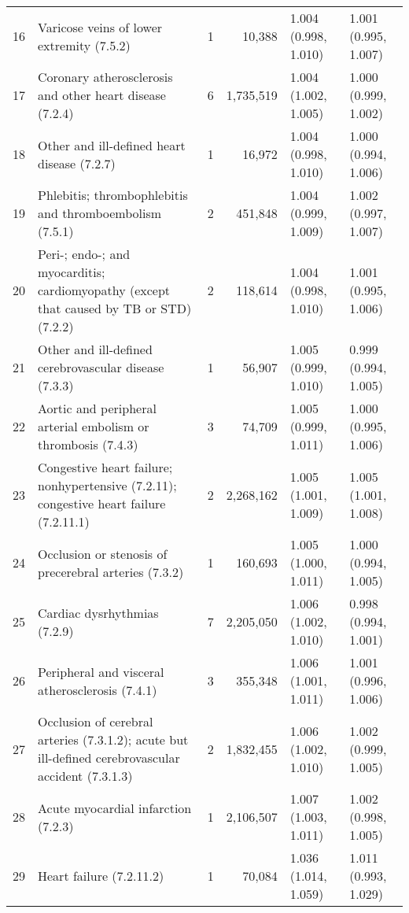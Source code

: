 \begin{tabular}{lp{6.5cm}rrp{2.2cm}p{2.2cm}}
    16 & Varicose veins of lower extremity (7.5.2) &    1 & 10,388 & 1.004 (0.998, 1.010) & 1.001 (0.995, 1.007) \\ 
    17 & Coronary atherosclerosis and other heart disease (7.2.4) &    6 & 1,735,519 & 1.004 (1.002, 1.005) & 1.000 (0.999, 1.002) \\ 
    18 & Other and ill-defined heart disease (7.2.7) &    1 & 16,972 & 1.004 (0.998, 1.010) & 1.000 (0.994, 1.006) \\ 
    19 & Phlebitis; thrombophlebitis and thromboembolism (7.5.1) &    2 & 451,848 & 1.004 (0.999, 1.009) & 1.002 (0.997, 1.007) \\ 
    20 & Peri-; endo-; and myocarditis; cardiomyopathy (except that caused by TB or STD) (7.2.2) &    2 & 118,614 & 1.004 (0.998, 1.010) & 1.001 (0.995, 1.006) \\ 
    21 & Other and ill-defined cerebrovascular disease (7.3.3) &    1 & 56,907 & 1.005 (0.999, 1.010) & 0.999 (0.994, 1.005) \\ 
    22 & Aortic and peripheral arterial embolism or thrombosis (7.4.3) &    3 & 74,709 & 1.005 (0.999, 1.011) & 1.000 (0.995, 1.006) \\ 
    23 & Congestive heart failure; nonhypertensive (7.2.11); congestive heart failure (7.2.11.1) &    2 & 2,268,162 & 1.005 (1.001, 1.009) & 1.005 (1.001, 1.008) \\ 
    24 & Occlusion or stenosis of precerebral arteries (7.3.2) &    1 & 160,693 & 1.005 (1.000, 1.011) & 1.000 (0.994, 1.005) \\ 
    25 & Cardiac dysrhythmias (7.2.9) &    7 & 2,205,050 & 1.006 (1.002, 1.010) & 0.998 (0.994, 1.001) \\ 
    26 & Peripheral and visceral atherosclerosis (7.4.1) &    3 & 355,348 & 1.006 (1.001, 1.011) & 1.001 (0.996, 1.006) \\ 
    27 & Occlusion of cerebral arteries (7.3.1.2); acute but ill-defined cerebrovascular accident (7.3.1.3) &    2 & 1,832,455 & 1.006 (1.002, 1.010) & 1.002 (0.999, 1.005) \\ 
    28 & Acute myocardial infarction (7.2.3) &    1 & 2,106,507 & 1.007 (1.003, 1.011) & 1.002 (0.998, 1.005) \\ 
    29 & Heart failure (7.2.11.2) &    1 & 70,084 & 1.036 (1.014, 1.059) & 1.011 (0.993, 1.029) \\ 
   \hline
\end{tabular}

